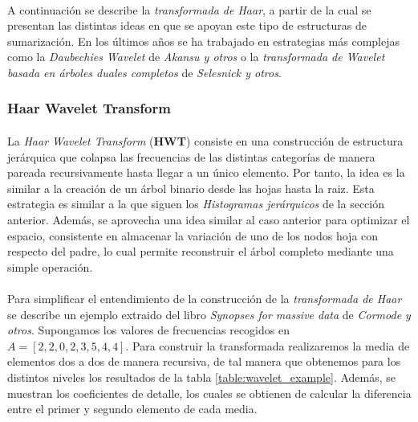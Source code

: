\documentclass{subfiles}
\begin{document}
        \paragraph{}
        A continuación se describe la \emph{transformada de Haar}, a partir de la cual se presentan las distintas ideas en que se apoyan este tipo de estructuras de sumarización. En los últimos años se ha trabajado en estrategias más complejas como la \emph{Daubechies Wavelet} \cite{akansu2001multiresolution} de \emph{Akansu y otros} o la \emph{transformada de Wavelet basada en árboles duales completos} \cite{selesnick2005dual} de \emph{Selesnick y otros}.

        \subsubsection{Haar Wavelet Transform}

          \paragraph{}
          La \emph{Haar Wavelet Transform} (\textbf{HWT}) consiste en una construcción de estructura jerárquica que colapsa las frecuencias de las distintas categorías de manera pareada recursivamente hasta llegar a un único elemento. Por tanto, la idea es la similar a la creación de un árbol binario desde las hojas hasta la raiz. Esta estrategia es similar a la que siguen los \emph{Histogramas jerárquicos} de la sección anterior. Además, se aprovecha una idea similar al caso anterior para optimizar el espacio, consistente en almacenar la variación de uno de los nodos hoja con respecto del padre, lo cual permite reconstruir el árbol completo mediante una simple operación.

          \paragraph{}
          Para simplificar el entendimiento de la construcción de la \emph{transformada de Haar} se describe un ejemplo extraido del libro \emph{Synopses for massive data} \cite{cormode2012synopses} de \emph{Cormode y otros}. Supongamos los valores de frecuencias recogidos en $A = [2,2,0,2,3,5,4,4]$. Para construir la transformada realizaremos la media de elementos dos a dos de manera recursiva, de tal manera que obtenemos para los distintos niveles los resultados de la tabla \ref{table:wavelet_example}. Además, se muestran los coeficientes de detalle, los cuales se obtienen de calcular la diferencia entre el primer y segundo elemento de cada media.
\end{document}
